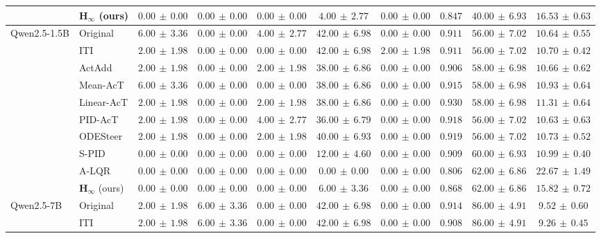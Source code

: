\begin{table}[!htbp]
{\begin{tabular}{llccccc|ccc}
 & $\boldsymbol{H_\infty}$ (ours) & $0.00\,\pm\,0.00$ & $0.00\,\pm\,0.00$ & $0.00\,\pm\,0.00$ & $4.00\,\pm\,2.77$ & $0.00\,\pm\,0.00$ & $0.847$ & $40.00\,\pm\,6.93$ & $16.53\,\pm\,0.63$\\
\midrule
\multirow{10}{*}{Qwen2.5-1.5B} & Original & $6.00\,\pm\,3.36$ & $0.00\,\pm\,0.00$ & $4.00\,\pm\,2.77$ & $42.00\,\pm\,6.98$ & $0.00\,\pm\,0.00$ & $0.911$ & $56.00\,\pm\,7.02$ & $10.64\,\pm\,0.55$\\
 & ITI & $2.00\,\pm\,1.98$ & $0.00\,\pm\,0.00$ & $0.00\,\pm\,0.00$ & $42.00\,\pm\,6.98$ & $2.00\,\pm\,1.98$ & $0.911$ & $56.00\,\pm\,7.02$ & $10.70\,\pm\,0.42$\\
 & ActAdd & $2.00\,\pm\,1.98$ & $0.00\,\pm\,0.00$ & $2.00\,\pm\,1.98$ & $38.00\,\pm\,6.86$ & $0.00\,\pm\,0.00$ & $0.906$ & $58.00\,\pm\,6.98$ & $10.66\,\pm\,0.62$\\
 & Mean-AcT & $6.00\,\pm\,3.36$ & $0.00\,\pm\,0.00$ & $0.00\,\pm\,0.00$ & $38.00\,\pm\,6.86$ & $0.00\,\pm\,0.00$ & $0.915$ & $58.00\,\pm\,6.98$ & $10.93\,\pm\,0.64$\\
 & Linear-AcT & $2.00\,\pm\,1.98$ & $0.00\,\pm\,0.00$ & $2.00\,\pm\,1.98$ & $38.00\,\pm\,6.86$ & $0.00\,\pm\,0.00$ & $0.930$ & $58.00\,\pm\,6.98$ & $11.31\,\pm\,0.64$\\
 & PID-AcT & $2.00\,\pm\,1.98$ & $0.00\,\pm\,0.00$ & $4.00\,\pm\,2.77$ & $36.00\,\pm\,6.79$ & $0.00\,\pm\,0.00$ & $0.918$ & $56.00\,\pm\,7.02$ & $10.63\,\pm\,0.63$\\
 & ODESteer & $2.00\,\pm\,1.98$ & $0.00\,\pm\,0.00$ & $2.00\,\pm\,1.98$ & $40.00\,\pm\,6.93$ & $0.00\,\pm\,0.00$ & $0.919$ & $56.00\,\pm\,7.02$ & $10.73\,\pm\,0.52$\\
 & S-PID & $0.00\,\pm\,0.00$ & $0.00\,\pm\,0.00$ & $0.00\,\pm\,0.00$ & $12.00\,\pm\,4.60$ & $0.00\,\pm\,0.00$ & $0.909$ & $60.00\,\pm\,6.93$ & $10.99\,\pm\,0.40$\\
 & A-LQR & $0.00\,\pm\,0.00$ & $0.00\,\pm\,0.00$ & $0.00\,\pm\,0.00$ & $0.00\,\pm\,0.00$ & $0.00\,\pm\,0.00$ & $0.806$ & $62.00\,\pm\,6.86$ & $22.67\,\pm\,1.49$\\
 & $\boldsymbol{H_\infty}$ (ours) & $0.00\,\pm\,0.00$ & $0.00\,\pm\,0.00$ & $0.00\,\pm\,0.00$ & $6.00\,\pm\,3.36$ & $0.00\,\pm\,0.00$ & $0.868$ & $62.00\,\pm\,6.86$ & $15.82\,\pm\,0.72$\\
\midrule
\multirow{10}{*}{Qwen2.5-7B} & Original & $2.00\,\pm\,1.98$ & $6.00\,\pm\,3.36$ & $0.00\,\pm\,0.00$ & $42.00\,\pm\,6.98$ & $0.00\,\pm\,0.00$ & $0.914$ & $86.00\,\pm\,4.91$ & $9.52\,\pm\,0.60$\\
 & ITI & $2.00\,\pm\,1.98$ & $6.00\,\pm\,3.36$ & $0.00\,\pm\,0.00$ & $42.00\,\pm\,6.98$ & $0.00\,\pm\,0.00$ & $0.908$ & $86.00\,\pm\,4.91$ & $9.26\,\pm\,0.45$\\

\end{tabular}}
\end{table}
